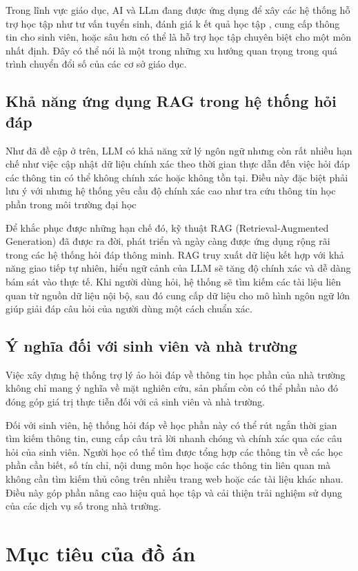 \documentclass[../DoAn.tex]{subfiles}
\begin{document}
Trong lĩnh vực giáo dục, AI và LLm đang được ứng dụng để xây các hệ thống hỗ trợ học tập như tư vấn tuyển sinh, đánh giá k ết quả học tập , cung cấp thông tin cho sinh viên, hoặc sâu hơn có thể là hỗ trợ học tập chuyên biệt cho một môn nhất định. Đây có thể nói là một trong những xu hướng quan trọng trong quá trình chuyển đổi số của các cơ sở giáo dục.

\subsection{Khả năng ứng dụng RAG trong hệ thống hỏi đáp}
Như đã đề cập ở trên, LLM có khả năng xử lý ngôn ngữ nhưng còn rất nhiều hạn chế như việc cập nhật dữ liệu chính xác theo thời gian thực dẫn đến việc hỏi đáp các thông tin có thể không chính xác hoặc không tồn tại. Điều này đặc biệt phải lưu ý với nhưng hệ thống yêu cầu độ chính xác cao như tra cứu thông tin học phần trong môi trường đại học

Để khắc phục được những hạn chế đó, kỹ thuật RAG (Retrieval-Augmented Generation) đã được ra đời, phát triển và ngày càng được ứng dụng rộng rãi trong các hệ thống hỏi đáp thông minh. RAG truy xuất dữ liệu kết hợp với khả năng giao tiếp tự nhiên, hiểu ngữ cảnh của LLM sẽ tăng độ chính xác và dễ dàng bám sát vào thực tế. Khi người dùng hỏi, hệ thống sẽ tìm kiếm các tài liệu liên quan từ nguồn dữ liệu nội bộ, sau đó cung cấp dữ liệu cho mô hình ngôn ngữ lớn giúp giải đáp câu hỏi của người dùng một cách chuẩn xác.

\subsection{Ý nghĩa đối với sinh viên và nhà trường}
Việc xây dựng hệ thống trợ lý ảo hỏi đáp về thông tin học phần của nhà trường không chỉ mang ý nghĩa về mặt nghiên cứu, sản phẩm còn có thể phần nào đó đóng góp giá trị thực tiễn đối với cả sinh viên và nhà trường.

Đối với sinh viên, hệ thống hỏi đáp về học phần này có thể rút ngắn thời gian tìm kiếm thông tin, cung cấp câu trả lời nhanh chóng và chính xác qua các câu hỏi của sinh viên. Người học có thể tìm được tổng hợp các thông tin về các học phần cần biết, số tín chỉ, nội dung môn học hoặc các thông tin liên quan mà không cần tìm kiếm thủ công trên nhiều trang web hoặc các tài liệu khác nhau. Điều này góp phần nâng cao hiệu quả học tập và cải thiện trải nghiệm sử dụng của các dịch vụ số trong nhà trường.
\section{Mục tiêu của đồ án}
\end{document}
